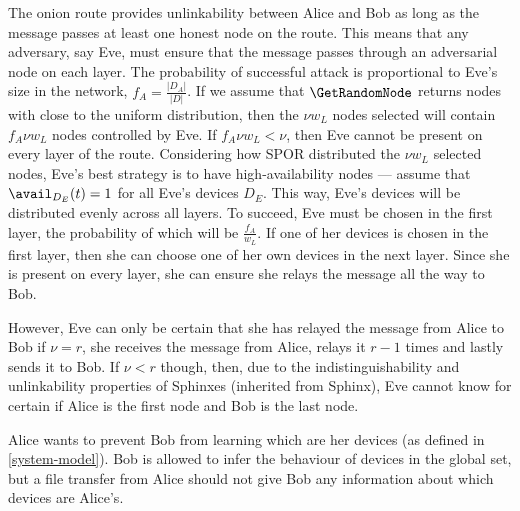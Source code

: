 The onion route provides unlinkability between Alice and Bob as long as the 
message passes at least one honest node on the route.
This means that any adversary, say Eve,  must ensure that the message passes 
through an adversarial node on each layer.
The probability of successful attack is proportional to Eve's size in the 
network, \ie \(f_A = \frac{|D_A|}{|D|}\).
If we assume that \(\GetRandomNode\) returns nodes with close to the uniform 
distribution, then the \(\nu w_L\) nodes selected will contain \(f_A \nu w_L\) 
nodes controlled by Eve.
If \(f_A \nu w_L < \nu\), then Eve cannot be present on every layer of the 
route.
Considering how \ac{SPOR} distributed the \(\nu w_L\) selected nodes, Eve's 
best strategy is to have high-availability nodes --- assume that 
\(\avail_{D_E}(t) = 1\) for all Eve's devices \(D_E\).
This way, Eve's devices will be distributed evenly across all layers.
To succeed, Eve must be chosen in the first layer, the probability of which 
will be \(\frac{f_A}{w_L}\).
If one of her devices is chosen in the first layer, then she can choose one of 
her own devices in the next layer.
Since she is present on every layer, she can ensure she relays the message all 
the way to Bob.

However, Eve can only be certain that she has relayed the message from Alice to 
Bob if \(\nu = r\), \ie she receives the message from Alice, relays it \(r-1\) 
times and lastly sends it to Bob.
If \(\nu < r\) though, then, due to the indistinguishability and unlinkability 
properties of Sphinxes (inherited from Sphinx), Eve cannot know for certain if 
Alice is the first node and Bob is the last node.


Alice wants to prevent Bob from learning which are her devices (as defined in 
\cref{system-model}).
Bob is allowed to infer the behaviour of devices in the global set,
but a file transfer from Alice should not give Bob any information about which 
devices are Alice's.

